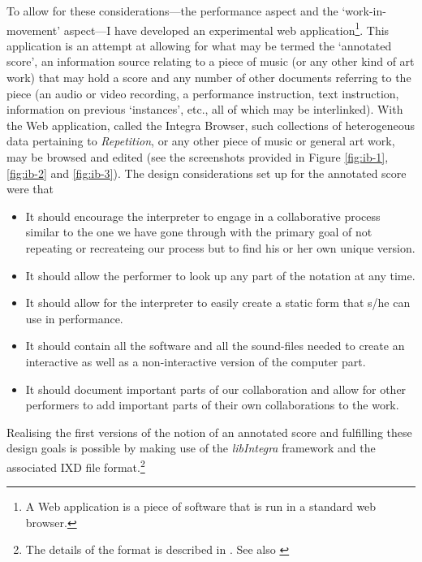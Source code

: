 
To allow for these considerations---the performance aspect and the `work-in-movement' aspect---I have developed an experimental web application\footnote{A Web application is a piece of software that is run in a standard web browser.}. This application is an attempt at allowing for what may be termed the `annotated score', an information source relating to a piece of music (or any other kind of art work) that may hold a score and any number of other documents referring to the piece (an audio or video recording, a performance instruction, text instruction, information on previous `instances', etc., all of which may be interlinked). With the Web application, called the Integra Browser, such collections of heterogeneous data pertaining to \emph{Repetition}, or any other piece of music or general art work, may be browsed and edited (see the screenshots provided in Figure \ref{fig:ib-1}, \ref{fig:ib-2} and \ref{fig:ib-3}). The design considerations set up for the annotated score were that
\begin{itemize}
\item It should encourage the interpreter to engage in a collaborative
  process similar to the one we have gone through with the primary
  goal of not repeating or recreateing our process but to find his or her
  own unique version.  
\item It should allow the performer to look up any part of the
  notation at any time.
\item It should allow for the interpreter to easily create a static
  form that s/he can use in performance.
\item It should contain all the software and all the sound-files needed
  to create an interactive as well as a non-interactive version of the
  computer part.
\item It should document important parts of our collaboration and
  allow for other performers to add important parts of their own
  collaborations to the work.
\end{itemize}
Realising the first versions of the notion of an annotated score and fulfilling these design goals is possible by making use of the \emph{libIntegra} framework and the associated IXD file format.\footnote{The details of the format is described in \cite{frisk-bull07}. See also \cite{frisk-bullock08}}

